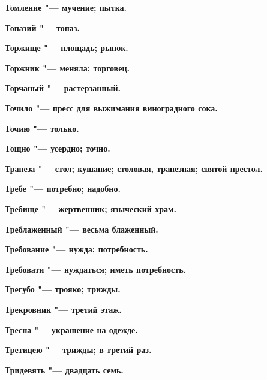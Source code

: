 \begin{mymulticols}{2}
\bfseries Томление\normalfont{} "--- мучение; пытка. 




\bfseries Топазий\normalfont{} "--- топаз. 




\bfseries Торжище\normalfont{} "--- площадь; рынок. 




\bfseries Торжник\normalfont{} "--- меняла; торговец. 




\bfseries Торчаный\normalfont{} "--- растерзанный. 




\bfseries Точило\normalfont{} "--- пресс для выжимания виноградного сока. 




\bfseries Точию\normalfont{} "--- только. 




\bfseries Тощно\normalfont{} "--- усердно; точно. 




\bfseries Трапеза\normalfont{} "--- стол; кушание; столовая, трапезная; святой престол. 




\bfseries Требе\normalfont{} "--- потребно; надобно. 




\bfseries Требище\normalfont{} "--- жертвенник; языческий храм. 




\bfseries Треблаженный\normalfont{} "--- весьма блаженный. 




\bfseries Требование\normalfont{} "--- нужда; потребность. 




\bfseries Требовати\normalfont{} "--- нуждаться; иметь потребность. 




\bfseries Трегубо\normalfont{} "--- трояко; трижды. 




\bfseries Трекровник\normalfont{} "--- третий этаж. 




\bfseries Тресна\normalfont{} "--- украшение на одежде. 




\bfseries Третицею\normalfont{} "--- трижды; в третий раз. 




\bfseries Тридевять\normalfont{} "--- двадцать семь. 





\end{mymulticols}
